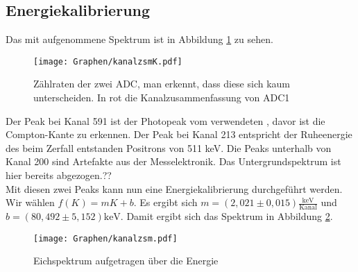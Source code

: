 \documentclass[twoside,colorback,accentcolor=tud4c,11pt]{tudreport}
\begin{document}
\subsection{Energiekalibrierung}
Das mit  aufgenommene Spektrum ist in Abbildung \ref{fig:kanalK} zu sehen.
\begin{figure}[H]
\centering
   	\begin{minipage}[b]{\textwidth}
   	\texttt{[image: Graphen/kanalzsmK.pdf]}
   	\caption{Zählraten der zwei ADC, man erkennt, dass diese sich kaum unterscheiden. In rot die Kanalzusammenfassung von ADC1}
  	\label{fig:kanalK}
   	\end{minipage}
\end{figure}
Der Peak bei Kanal 591 ist der Photopeak vom verwendeten , davor ist die Compton-Kante zu erkennen. Der Peak bei Kanal 213 entspricht der Ruheenergie des beim Zerfall entstanden Positrons von 511 keV. Die Peaks unterhalb von Kanal 200 sind Artefakte aus der Messelektronik. Das Untergrundspektrum ist hier bereits abgezogen.??\\
Mit diesen zwei Peaks kann nun eine Energiekalibrierung durchgeführt werden. Wir wählen $ f(K)=mK+b $. Es ergibt sich $ m=(2,021\pm0,015)\frac{\text{keV}}{\text{Kanal}} $ und $ b=(80,492\pm5,152) \text{keV}$. Damit ergibt sich das Spektrum in Abbildung \ref{fig:kanal}.
\begin{figure}[H]
\centering
   	\begin{minipage}[b]{\textwidth}
   	\texttt{[image: Graphen/kanalzsm.pdf]}
   	\caption{Eichspektrum aufgetragen über die Energie}
  	\label{fig:kanal}
   	\end{minipage}
\end{figure}
\end{document}
